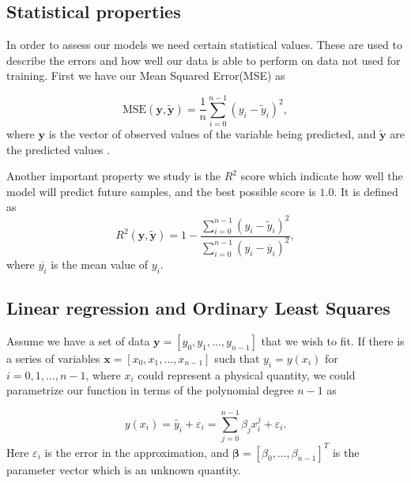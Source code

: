 \documentclass[norsk,a4paper,12pt]{article}
\begin{document}
\begin{multicols}{2}
\subsection{Statistical properties}
In order to assess our models we need certain statistical values. These are used to describe the errors and how well our data is able to perform on data not used for training. First we have our Mean Squared Error(MSE) as

\begin{equation}
    \mathrm{MSE}(\mathbf{y}, \mathbf{\tilde{y}}) = \frac{1}{n} \sum_{i=0}^{n-1} (y_i - \tilde{y}_i)^2,
    \label{eq:mse}
\end{equation}
where $\mathbf{y}$ is the vector of observed values of the variable being predicted, and $\mathbf{\tilde{y}}$ are the predicted values \cite{morten}.


Another important property we study is the $R^2$ score which indicate how well the model will predict future samples, and the best possible score is $1.0$. It is defined as
\begin{equation}
    R^2 (\mathbf{y}, \mathbf{\tilde{y}}) = 1 - \frac{\sum_{i=0}^{n-1} (y_i - \tilde{y}_i)^2}{\sum_{i=0}^{n-1} (y_i - \overline{y}_i)^2},
    \label{eq:r2}
\end{equation}
where $\overline{y_i}$ is the mean value of $y_i$.


\subsection{Linear regression and Ordinary Least Squares}
Assume we have a set of data $\mathbf{y} = [y_0, y_1, ..., y_{n-1}]$ that we wish to fit. If there is a series of variables $\mathbf{x} = [x_0,x_1, ..., x_{n-1}]$ such that $y_i = y(x_i)$ for $i = 0,1, ..., n-1$, where $x_i$ could represent a physical quantity, we could parametrize our function in terms of the polynomial degree $n-1$ as

\begin{equation*}
    y(x_i) = \tilde{y_i} + \varepsilon_i = \sum_{j=0}^{n-1} \beta_j x_i^j + \varepsilon_i.
\end{equation*}
Here $\varepsilon_i$ is the error in the approximation, and $\boldsymbol{\beta} = [\beta_0, ..., \beta_{n-1}]^T$ is the parameter vector which is an unknown quantity.


\end{multicols}
\end{document}
